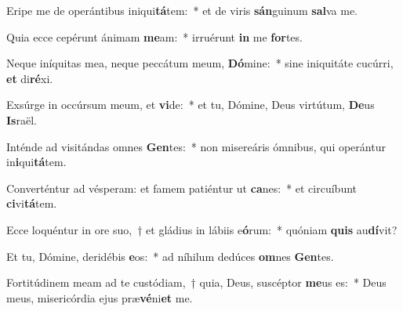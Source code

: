 \item Eripe me de operántibus iniqui\textbf{tá}tem:~* et de viris \textbf{sán}guinum \textbf{sal}va me.
\item Quia ecce cepérunt ánimam \textbf{me}am:~* irruérunt \textbf{in} me \textbf{for}tes.
\item Neque iníquitas mea, neque peccátum meum, \textbf{Dó}mine:~* sine iniquitáte cucúrri, \textbf{et} di\textbf{ré}xi.
\item Exsúrge in occúrsum meum, et \textbf{vi}de:~* et tu, Dómine, Deus virtútum, \textbf{De}us \textbf{Is}raël.
\item Inténde ad visitándas omnes \textbf{Gen}tes:~* non misereáris ómnibus, qui operántur in\textbf{i}qui\textbf{tá}tem.
\item Converténtur ad vésperam: et famem patiéntur ut \textbf{ca}nes:~* et circuíbunt \textbf{ci}vi\textbf{tá}tem.
\item Ecce loquéntur in ore suo,~† et gládius in lábiis e\textbf{ó}rum:~* quóniam \textbf{quis} au\textbf{dí}vit?
\item Et tu, Dómine, deridébis \textbf{e}os:~* ad níhilum dedúces \textbf{om}nes \textbf{Gen}tes.
\item Fortitúdinem meam ad te custódiam,~† quia, Deus, suscéptor \textbf{me}us es:~* Deus meus, misericórdia ejus præ\textbf{vé}ni\textbf{et} me.
